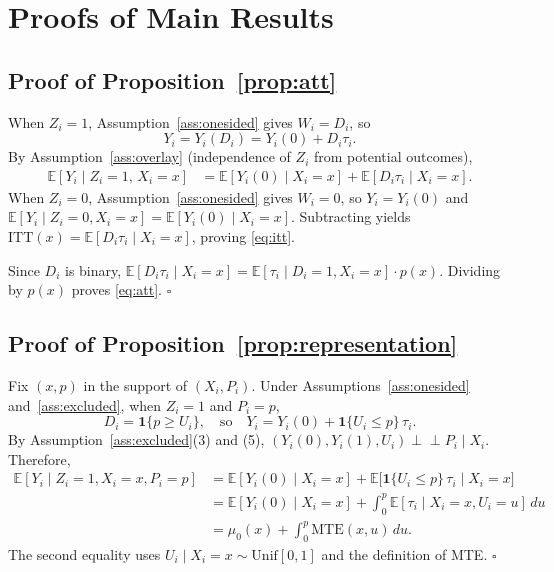 \documentclass[12pt]{article}
\newcommand{\E}{\mathbb{E}}
\newcommand{\indep}{\perp\!\!\!\perp}
\newcommand{\ITT}{\mathrm{ITT}}
\newcommand{\MTE}{\mathrm{MTE}}
\begin{document}
\clearpage
\appendix
\section{Proofs of Main Results}
\label{app:proofs}

\subsection*{Proof of Proposition~\ref{prop:att}}

When $Z_i = 1$, Assumption~\ref{ass:onesided} gives $W_i = D_i$, so
\[
  Y_i = Y_i(D_i) = Y_i(0) + D_i \tau_i.
\]
By Assumption~\ref{ass:overlay} (independence of $Z_i$ from potential outcomes),
\begin{align*}
  \E[Y_i \mid Z_i = 1,\, X_i = x]
  &= \E[Y_i(0) \mid X_i = x] + \E[D_i \tau_i \mid X_i = x].
\end{align*}
When $Z_i = 0$, Assumption~\ref{ass:onesided} gives $W_i = 0$, so
$Y_i = Y_i(0)$ and $\E[Y_i \mid Z_i = 0, X_i = x] = \E[Y_i(0) \mid X_i = x]$.
Subtracting yields $\ITT(x) = \E[D_i \tau_i \mid X_i = x]$, proving
\eqref{eq:itt}.

Since $D_i$ is binary,
$\E[D_i \tau_i \mid X_i = x] = \E[\tau_i \mid D_i = 1, X_i = x] \cdot p(x)$.
Dividing by $p(x)$ proves \eqref{eq:att}. \hfill$\square$

\subsection*{Proof of Proposition~\ref{prop:representation}}

Fix $(x, p)$ in the support of $(X_i, P_i)$. Under
Assumptions~\ref{ass:onesided} and~\ref{ass:excluded}, when $Z_i = 1$ and
$P_i = p$,
\[
  D_i = \mathbf{1}\{p \geq U_i\},
  \quad\text{so}\quad
  Y_i = Y_i(0) + \mathbf{1}\{U_i \leq p\}\, \tau_i.
\]
By Assumption~\ref{ass:excluded}(3) and (5), $(Y_i(0), Y_i(1), U_i)
\indep P_i \mid X_i$. Therefore,
\begin{align*}
  \E[Y_i \mid Z_i=1, X_i=x, P_i=p]
  &= \E[Y_i(0) \mid X_i=x]
     + \E\bigl[\mathbf{1}\{U_i \leq p\}\,\tau_i \mid X_i=x\bigr] \\
  &= \E[Y_i(0) \mid X_i=x]
     + \int_0^p \E[\tau_i \mid X_i=x, U_i=u]\,du \\
  &= \mu_0(x) + \int_0^p \MTE(x,u)\,du.
\end{align*}
The second equality uses $U_i \mid X_i=x \sim \mathrm{Unif}[0,1]$ and
the definition of MTE. \hfill$\square$
\end{document}
